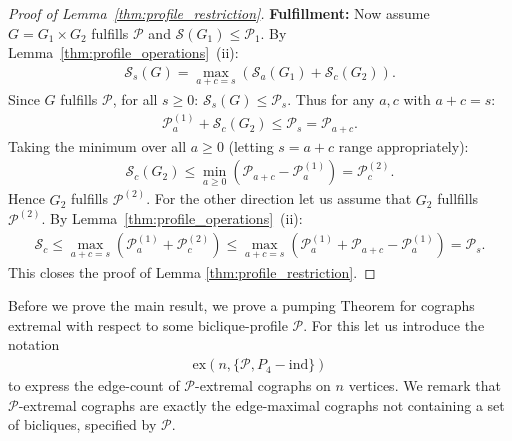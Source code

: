 \documentclass{article}
\theoremstyle{definition}
\theoremstyle{definition}
\theoremstyle{definition}
\theoremstyle{definition}
\theoremstyle{definition}
\theoremstyle{definition}
\theoremstyle{definition}
\theoremstyle{definition}
\theoremstyle{definition}
\theoremstyle{definition}
\newenvironment{proofref}[2]{%
  \begin{proof}[Proof of #1~\ref{#2}]%
}{%
  \end{proof}%
}
\begin{document}
\begin{proofref}{Lemma}{thm:profile_restriction}
    \textbf{Fulfillment:} Now assume $G = G_1 \times G_2$ fulfills $\mathscr{P}$ and $\mathscr{S}(G_1) \leq \mathscr{P}_1$. By Lemma~\ref{thm:profile_operations}~(ii):
    \begin{align*}
        \mathscr{S}_s(G) = \max_{a+c=s} \left( \mathscr{S}_a(G_1) + \mathscr{S}_c(G_2) \right).
    \end{align*}
    Since $G$ fulfills $\mathscr{P}$, for all $s \geq 0$: $\mathscr{S}_s(G) \leq \mathscr{P}_s$. Thus for any $a, c$ with $a + c = s$:
    \begin{align*}
        \mathscr{P}^{(1)}_a + \mathscr{S}_c(G_2) \leq \mathscr{P}_s = \mathscr{P}_{a+c}.
    \end{align*}
    Taking the minimum over all $a \geq 0$ (letting $s = a + c$ range appropriately):
    \begin{align*}
        \mathscr{S}_c(G_2) \leq \min_{a \geq 0} \left( \mathscr{P}_{a+c} - \mathscr{P}^{(1)}_{a} \right) = \mathscr{P}^{(2)}_{c}.
    \end{align*}
    Hence $G_2$ fulfills $\mathscr{P}^{(2)}$. For the other direction let us assume that $G_2$ fullfills $\mathscr{P}^{(2)}$.
    By Lemma~\ref{thm:profile_operations}~(ii):
    \begin{align}
        \mathscr{S}_c
            \leq \max_{a+c = s} \left( \mathscr{P}^{(1)}_a + \mathscr{P}^{(2)}_c \right)
            \leq \max_{a+c = s} \left( \mathscr{P}^{(1)}_a + \mathscr{P}_{a + c} - \mathscr{P}^{(1)}_a \right)
            = \mathscr{P}_{s}.
    \end{align}
    This closes the proof of Lemma \ref{thm:profile_restriction}.
\end{proofref}

Before we prove the main result, we prove a pumping Theorem for cographs extremal with respect to some biclique-profile $\mathscr{P}$. For this let us introduce the notation
\begin{align}
    \text{ex} \left( n, \{ \mathscr{P}, P_4 - \text{ind} \} \right)
\end{align}
to express the edge-count of $\mathscr{P}$-extremal cographs on $n$ vertices.
We remark that $\mathscr{P}$-extremal cographs are exactly the edge-maximal cographs not containing a set of bicliques, specified by $\mathscr{P}$.
\end{document}
